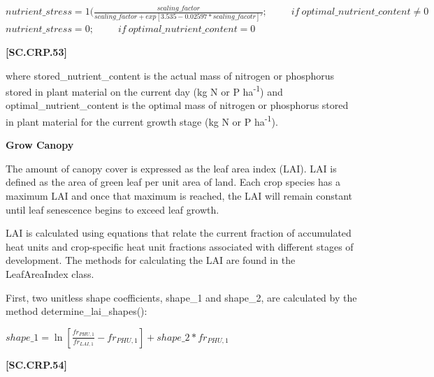     \begin{center}
        \(nutrient\_stress=1(\frac{scaling\_factor}{scaling\_factor+exp[3.535-0.02597*scaling\_facotr]'};\ \ \ \ \ \ \ \ \ \ \ if\  optimal\_nutrient\_content \neq 0\) \\
        \(nutrient\_stress=0;\ \ \ \ \ \ \ \ \ \ \ if\  optimal\_nutrient\_content = 0\)
    \end{center}
        \vspace{0.5cm}
    
            {\raggedleft \textbf{[SC.CRP.53]}\par}
            \vspace{0.5cm}

where stored\_nutrient\_content is the actual mass of nitrogen or phosphorus stored in plant material on the current day (kg N or P ha\textsuperscript{-1}) and optimal\_nutrient\_content is the optimal mass of nitrogen or phosphorus stored in plant material for the current growth stage (kg N or P ha\textsuperscript{-1}). 
\vspace{0.2cm}

\textbf{ Grow Canopy}
\vspace{0.2cm}

The amount of canopy cover is expressed as the leaf area index (LAI). LAI is defined as the area of green leaf per unit area of land. Each crop species has a maximum LAI and once that maximum is reached, the LAI will remain constant until leaf senescence begins to exceed leaf growth. 
	
LAI is calculated using equations that relate the current fraction of accumulated heat units and crop-specific heat unit fractions associated with different stages of development. The methods for calculating the LAI are found in the LeafAreaIndex class.

First, two unitless shape coefficients, shape\_1 and shape\_2, are calculated by the method determine\_lai\_shapes():
   \vspace{0.2cm}

    \begin{center}
        \(shape\_1=\ln[\frac{fr_{PHU,1}}{fr_{LAI,1}}-fr_{PHU,1}]+shape\_2 * fr_{PHU,1}\) 
    \end{center}
        \vspace{0.5cm}
    
            {\raggedleft \textbf{[SC.CRP.54]}\par}
            \vspace{0.5cm}

